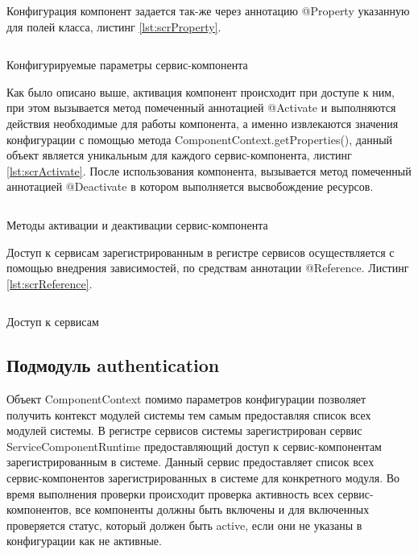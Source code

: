 Конфигурация компонент задается так-же через аннотацию @Property указанную для полей класса, листинг \ref{lst:scrProperty}. 

\begin{listing}[H]
\inputminted[linenos,frame=single]{java}{inc/src/scrProperty}
\caption{Конфигурируемые параметры сервис-компонента} 
\label{lst:scrProperty}
\end{listing}

Как было описано выше, активация компонент происходит при доступе к ним, при этом вызывается метод помеченный аннотацией @Activate и выполняются действия необходимые для работы компонента, а именно извлекаются значения конфигурации с помощью метода ComponentContext.getProperties(), данный объект является уникальным для каждого сервис-компонента, листинг \ref{lst:scrActivate}. После использования компонента, вызывается метод помеченный аннотацией @Deactivate в котором выполняется высвобождение ресурсов.

\begin{listing}[H]
\inputminted[linenos,frame=single]{java}{inc/src/scrActivate}
\caption{Методы активации и деактивации сервис-компонента} 
\label{lst:scrActivate}
\end{listing}

Доступ к сервисам зарегистрированным в регистре сервисов осуществляется с помощью внедрения зависимостей, по средствам аннотации @Reference. Листинг \ref{lst:scrReference}.

\begin{listing}[H]
\inputminted[linenos,frame=single]{java}{inc/src/scrReference}
\caption{Доступ к сервисам} 
\label{lst:scrReference}
\end{listing}

\subsection{Подмодуль authentication}
Объект ComponentContext помимо параметров конфигурации позволяет получить контекст модулей системы тем самым предоставляя список всех модулей системы. В регистре сервисов системы зарегистрирован сервис ServiceComponentRuntime предоставляющий доступ к сервис-компонентам зарегистрированным в системе. Данный сервис предоставляет список всех сервис-компонентов зарегистрированных в системе для конкретного модуля. Во время выполнения проверки происходит проверка активность всех сервис-компонентов, все компоненты должны быть включены и для включенных проверяется статус, который должен быть active, если они не указаны в конфигурации как не активные.

